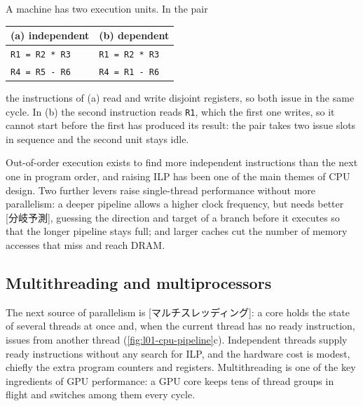 \documentclass[../main.tex]{subfiles}
\begin{document}
\begin{example}
  \label{ex:l01-ilp}
  A machine has two execution units.  In the pair
  \begin{center}
    \begin{tabular}{ll}
      \toprule
      (a) independent & (b) dependent \\
      \midrule
      \texttt{R1 = R2 * R3} & \texttt{R1 = R2 * R3} \\
      \texttt{R4 = R5 - R6} & \texttt{R4 = R1 - R6} \\
      \bottomrule
    \end{tabular}
  \end{center}
  the instructions of (a) read and write disjoint registers, so both
  issue in the same cycle.  In (b) the second instruction reads
  \texttt{R1}, which the first one writes, so it cannot start before the
  first has produced its result: the pair takes two issue slots in
  sequence and the second unit stays idle.
\end{example}

Out-of-order execution exists to find more independent instructions
than the next one in program order, and raising ILP has been one of the
main themes of CPU design.  Two further levers raise single-thread
performance without more parallelism: a deeper pipeline allows a higher
clock frequency, but needs better [分岐予測],
guessing the direction and target of a branch before it executes so
that the longer pipeline stays full; and larger caches cut the number of
memory accesses that miss and reach DRAM.

\subsection{Multithreading and multiprocessors}

The next source of parallelism is [マルチスレッディング]:
a core holds the state of several threads at once and, when the current
thread has no ready instruction, issues from another thread
(\cref{fig:l01-cpu-pipeline}c).  Independent threads supply ready
instructions without any search for ILP, and the hardware cost is
modest, chiefly the extra program counters and registers.
Multithreading is one of the key ingredients of GPU performance: a GPU
core keeps tens of thread groups in flight and switches among them every
cycle.
\end{document}
